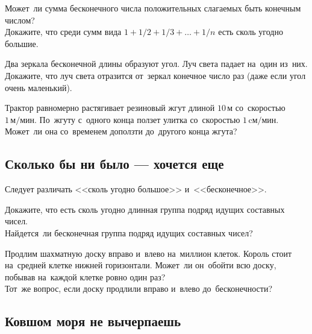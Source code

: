 \begin{problems}

\item
\subproblem
Может~ли сумма бесконечного числа положительных слагаемых быть конечным числом?
\\
\subproblem
Докажите, что среди сумм вида $1 + 1 / 2 + 1 / 3 + \ldots + 1 / n$ есть сколь
угодно большие.

\item
Два зеркала бесконечной длины образуют угол.
Луч света падает на~один из~них.
Докажите, что луч света отразится от~зеркал конечное число раз (даже если угол
очень маленький).


\item
Трактор равномерно растягивает резиновый жгут длиной $10\,\text{м}$
со~скоростью $1\,\text{м/мин}$.
По~жгуту с~одного конца ползет улитка со~скоростью $1\,\text{cм/мин}$.
Может~ли она со~временем доползти до~другого конца жгута?

\end{problems}

\subsection*{Сколько бы ни было --- хочется еще}

Следует различать <<сколь угодно большое>> и~<<бесконечное>>.

\begin{problems}

\item
\subproblem
Докажите, что есть сколь угодно длинная группа подряд идущих составных чисел.
\\
\subproblem
Найдется~ли бесконечная группа подряд идущих составных чисел?

\item
\subproblem
Продлим шахматную доску вправо и~влево на~миллион клеток.
Король стоит на~средней клетке нижней горизонтали.
Может~ли он~обойти всю доску, побывав на~каждой клетке ровно один раз?
\\
\subproblem
Тот~же вопрос, если доску продлили вправо и~влево до~бесконечности?

\end{problems}

\subsection*{Ковшом моря не вычерпаешь}

